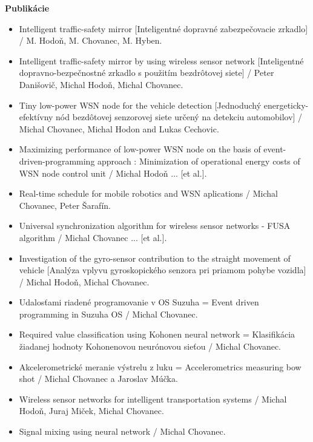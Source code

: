 \documentclass[xcolor=dvipsnames]{beamer}
\begin{document}
\begin{frame}{\bf Publikácie}


  	\tiny
\begin{itemize}
  \item Intelligent traffic-safety mirror [Inteligentné dopravné zabezpečovacie zrkadlo] / M. Hodoň, M. Chovanec, M. Hyben.
  \item Intelligent traffic-safety mirror by using wireless sensor network [Inteligentné dopravno-bezpečnostné zrkadlo s použitím bezdrôtovej siete] / Peter Danišovič, Michal Hodoň, Michal Chovanec.
  \item Tiny low-power WSN node for the vehicle detection [Jednoduchý energeticky-efektívny nód bezdôtovej senzorovej siete určený na detekciu automobilov] / Michal Chovanec, Michal Hodon and Lukas Cechovic.
  \item Maximizing performance of low-power WSN node on the basis of event-driven-programming approach : Minimization of operational energy costs of WSN node control unit / Michal Hodoň ... [et al.].
  \item Real-time schedule for mobile robotics and WSN aplications / Michal Chovanec, Peter Šarafín.
  \item Universal synchronization algorithm for wireless sensor networks - FUSA algorithm / Michal Chovanec ... [et al.].
  \item Investigation of the gyro-sensor contribution to the straight movement of vehicle [Analýza vplyvu gyroskopického senzora pri priamom pohybe vozidla] / Michal Hodoň, Michal Chovanec.
  \item Udalosťami riadené programovanie v OS Suzuha = Event driven programming in Suzuha OS / Michal Chovanec.
  \item Required value classification using Kohonen neural network = Klasifikácia žiadanej hodnoty Kohonenovou neurónovou sieťou / Michal Chovanec.
  \item Akcelerometrické meranie výstrelu z luku = Accelerometrics measuring bow shot / Michal Chovanec a Jaroslav Múčka.
  \item Wireless sensor networks for intelligent transportation systems / Michal Hodoň, Juraj Miček, Michal Chovanec.
  \item Signal mixing using neural network / Michal Chovanec.
\end{itemize}


\end{frame}
\end{document}
